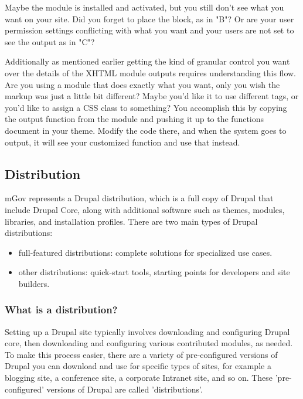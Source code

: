 Maybe the module is installed and activated, but you still don’t see what you want on your site. Did you forget to place the block, as in "B"? Or are your user permission settings conflicting with what you want and your users are not set to see the output as in "C"?

Additionally as mentioned earlier getting the kind of granular control you want over the details of the XHTML module outputs requires understanding this flow. Are you using a module that does exactly what you want, only you wish the markup was just a little bit different? Maybe you’d like it to use different tags, or you’d like to assign a CSS class to something? You accomplish this by copying the output function from the module and pushing it up to the functions document in your theme. Modify the code there, and when the system goes to output, it will see your customized function and use that instead.

\subsection{Distribution}

mGov represents a Drupal distribution, which is a full copy of Drupal that include Drupal Core, along with additional software such as themes, modules, libraries, and installation profiles. There are two main types of Drupal distributions:

\begin{itemize}
	\item full-featured distributions: complete solutions for specialized use cases.
	\item other distributions: quick-start tools, starting points for developers and site builders.
\end{itemize}

\subsubsection{What is a distribution?}

Setting up a Drupal site typically involves downloading and configuring Drupal core, then downloading and configuring various contributed modules, as needed. To make this process easier, there are a variety of pre-configured versions of Drupal you can download and use for specific types of sites, for example a blogging site, a conference site, a corporate Intranet site, and so on. These 'pre-configured' versions of Drupal are called 'distributions'.

